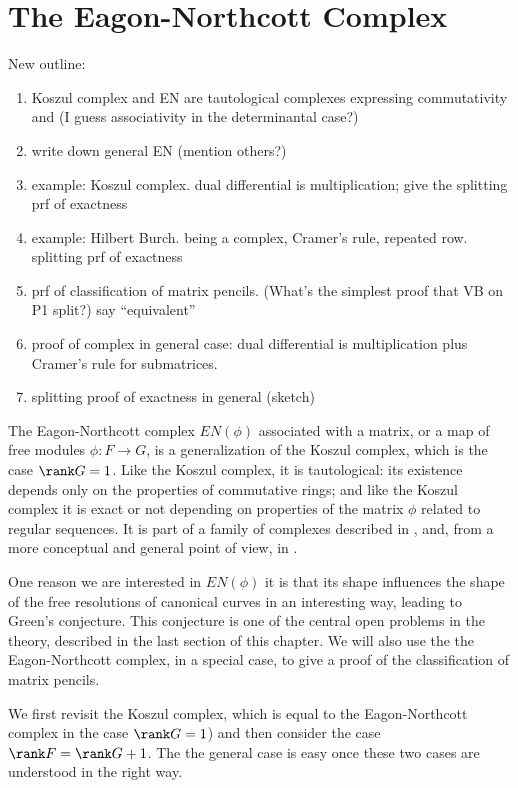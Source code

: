 \section{The Eagon-Northcott Complex}\label{EN section}

New outline:
\begin{enumerate}
 \item Koszul complex and EN are tautological complexes expressing commutativity and (I guess associativity in the determinantal case?)
 \item write down general EN (mention others?)
 \item example: Koszul complex. dual differential is multiplication; give the splitting prf of exactness
 \item example: Hilbert Burch. being a complex, Cramer's rule, repeated row. splitting prf of exactness 
 \item prf of classification of matrix pencils. (What's the simplest proof that VB on P1 split?) say ``equivalent''
 \item proof of complex in general case: dual differential is multiplication plus Cramer's rule for submatrices.
 \item splitting proof of exactness in general (sketch)
\end{enumerate}

The Eagon-Northcott complex $EN(\phi)$ associated with a matrix, or a map of free modules $\phi: F\to G$,
is a generalization of the Koszul complex, which is the case $\rank G = 1$. Like the Koszul complex,
it is tautological: its existence depends only on the properties of commutative rings; and like the Koszul complex it is exact or not depending on properties of the matrix $\phi$ related to regular sequences. It is part of a family of complexes described in
\cite[Appendix A2]{Eisenbud1995}, and, from a more conceptual and general point of view, in \cite{Weyman-book}. 

One reason we
are interested in $EN(\phi)$ it is that its shape
influences the shape of the free resolutions of canonical curves in an interesting way, 
leading to Green's conjecture. This conjecture is one of the central open problems in the theory, described in the last
section of this chapter. We will also use the the Eagon-Northcott complex, in a special case, to give a proof of the classification of matrix pencils.

We first revisit the Koszul complex, which is equal
to the Eagon-Northcott complex in the case $\rank G = 1$) and then consider the case $\rank F = \rank G + 1$.
The the general case is easy once these two cases are understood in the right way.

